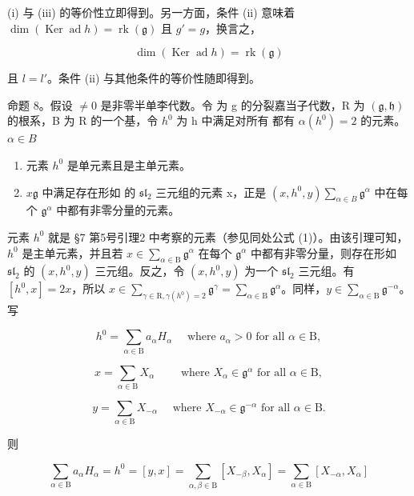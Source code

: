 (i) 与 (iii) 的等价性立即得到。另一方面，条件 (ii) 意味着 \(\dim(\operatorname{Ker} \operatorname{ad} h) = \operatorname{rk}(\mathfrak{g})\) 且 \(g' = g\)，换言之，

\[
\dim (\operatorname{Ker} \operatorname{ad} h) = \operatorname{rk} (\mathfrak {g})
\]

且 \(l = l'\)。条件 (ii) 与其他条件的等价性随即得到。

命题 8。假设 \(\neq 0\) 是非零半单李代数。令  为 g 的分裂嘉当子代数，R 为 \((\mathfrak{g},\mathfrak{h})\) 的根系，B 为 R 的一个基，令 \(h^{0}\) 为 h 中满足对所有  都有 \(\alpha(h^{0}) = 2\) 的元素。\(\alpha \in B\)

\begin{enumerate}
\def\labelenumi{(\roman{enumi})}
\item
  元素 \(h^0\) 是单元素且是主单元素。
\item
  \(x\)\(\mathfrak{g}\) 中满足存在形如  的 \(\mathfrak{sl}_2\) 三元组的元素 x，正是 \((x, h^0, y)\)\(\sum_{\alpha \in B} \mathfrak{g}^\alpha\) 中在每个 \(\mathfrak{g}^\alpha\) 中都有非零分量的元素。
\end{enumerate}

元素 \(h^0\) 就是 §7 第5号引理2 中考察的元素（参见同处公式 (1)）。由该引理可知，\(h^0\) 是主单元素，并且若 \(x \in \sum_{\alpha \in \mathrm{B}} \mathfrak{g}^\alpha\) 在每个 \(\mathfrak{g}^\alpha\) 中都有非零分量，则存在形如 \(\mathfrak{sl}_2\) 的 \((x, h^0, y)\) 三元组。反之，令 \((x, h^0, y)\) 为一个 \(\mathfrak{sl}_2\) 三元组。有 \([h^0, x] = 2x\)，所以 \(x \in \sum_{\gamma \in \mathrm{R}, \gamma(h^0) = 2} \mathfrak{g}^\gamma = \sum_{\alpha \in \mathrm{B}} \mathfrak{g}^\alpha\)。同样，\(y \in \sum_{\alpha \in \mathrm{B}} \mathfrak{g}^{-\alpha}\)。写

\[
h ^ {0} = \sum_ {\alpha \in \mathrm{B}} a _ {\alpha} H _ {\alpha} \quad \text { where } a _ {\alpha} > 0 \text { for all } \alpha \in \mathrm{B},
\]

\[
x = \sum_ {\alpha \in \mathrm{B}} X _ {\alpha} \qquad \text { where } X _ {\alpha} \in \mathfrak {g} ^ {\alpha} \text { for   all } \alpha \in \mathrm{B},
\]

\[
y = \sum_ {\alpha \in \mathrm{B}} X _ {- \alpha} \quad \text { where } X _ {- \alpha} \in \mathfrak {g} ^ {- \alpha} \text { for   all } \alpha \in \mathrm{B}.
\]

则

\[
\sum_ {\alpha \in \mathrm{B}} a _ {\alpha} H _ {\alpha} = h ^ {0} = [ y, x ] = \sum_ {\alpha , \beta \in \mathrm{B}} [ X _ {- \beta}, X _ {\alpha} ] = \sum_ {\alpha \in \mathrm{B}} [ X _ {- \alpha}, X _ {\alpha} ]
\]

